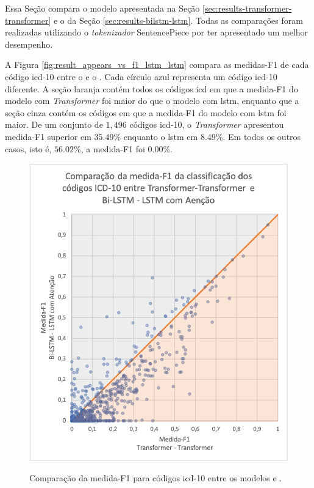 Essa Seção compara o modelo \xfmrxfmr{} apresentada na Seção \ref{sec:results-transformer-transformer} e o  \lstmlstm{} da Seção \ref{sec:results-bilstm-lstm}. Todas as comparações foram realizadas utilizando o \textit{tokenizador} SentencePiece por ter apresentado um melhor desempenho.

A Figura \ref{fig:result_appears_vs_f1_lstm_lstm} compara as medidas-F1 de cada código \gls{icd}-10 entre o \xfmrxfmr{} e o \lstmlstm{}. Cada círculo azul representa um código \gls{icd}-10 diferente. A seção laranja contém todos os códigos \gls{icd} em que a medida-F1 do modelo com \textit{Transformer} foi maior do que o modelo com \gls{lstm}, enquanto que a seção cinza contém os códigos em que a medida-F1 do modelo com \gls{lstm} foi maior. De um conjunto de $1,496$ códigos \gls{icd}-10, o \textit{Transformer} apresentou medida-F1 superior em $35.49\%$ enquanto o \gls{lstm} em $8.49\%$. Em todos os outros casos, isto é, $56.02\%$, a medida-F1 foi $0.00\%$.
\begin{figure}[htbp]
    \centering
        \caption{Comparação da medida-F1 para códigos \gls{icd}-10 entre os modelos \xfmrxfmr{} e \lstmlstm{}.}
        \includegraphics{resources/images/results/result_f1_comparison_xfmr_lstm_ptbr.png}
        \label{fig:result_f1_comparison_xfmr_lstm}
\end{figure}

